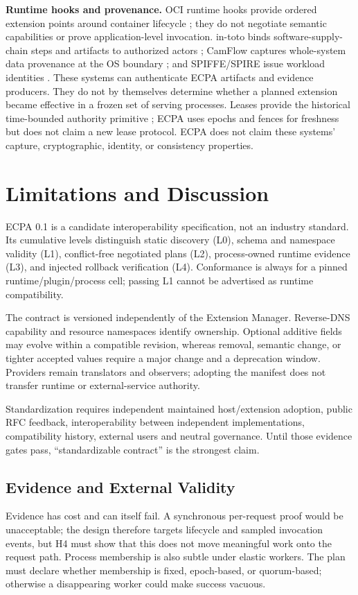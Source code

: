 \documentclass[letterpaper,twocolumn,10pt]{article}
\begin{document}
\textbf{Runtime hooks and provenance.}  OCI runtime hooks provide ordered
extension points around container lifecycle \cite{oci-runtime}; they do not
negotiate semantic capabilities or prove application-level invocation.
in-toto binds software-supply-chain steps and artifacts to authorized actors
\cite{in-toto}; CamFlow captures whole-system data provenance at the OS boundary
\cite{camflow}; and SPIFFE/SPIRE issue workload identities
\cite{spiffe,spire}.  These systems can authenticate ECPA artifacts and evidence
producers.  They do not by themselves determine whether a planned extension
became effective in a frozen set of serving processes.  Leases provide the
historical time-bounded authority primitive \cite{leases}; ECPA uses epochs and
fences for freshness but does not claim a new lease protocol.  ECPA does not
claim these systems' capture, cryptographic, identity, or consistency
properties.

\section{Limitations and Discussion}
ECPA 0.1 is a candidate interoperability specification, not an industry
standard.  Its cumulative levels distinguish static discovery (L0), schema and
namespace validity (L1), conflict-free negotiated plans (L2), process-owned
runtime evidence (L3), and injected rollback verification (L4).  Conformance
is always for a pinned runtime/plugin/process cell; passing L1 cannot be
advertised as runtime compatibility.

The contract is versioned independently of the Extension Manager.  Reverse-DNS
capability and resource namespaces identify ownership.  Optional additive
fields may evolve within a compatible revision, whereas removal, semantic
change, or tighter accepted values require a major change and a deprecation
window.  Providers remain translators and observers; adopting the manifest
does not transfer runtime or external-service authority.

Standardization requires independent maintained host/extension adoption,
public RFC feedback, interoperability between independent implementations,
compatibility history, external users and neutral governance.  Until those
evidence gates pass, ``standardizable contract'' is the strongest claim.

\subsection{Evidence and External Validity}
Evidence has cost and can itself fail.  A synchronous per-request proof would
be unacceptable; the design therefore targets lifecycle and sampled invocation
events, but H4 must show that this does not move meaningful work onto the
request path.  Process membership is also subtle under elastic workers.  The
plan must declare whether membership is fixed, epoch-based, or quorum-based;
otherwise a disappearing worker could make success vacuous.
\end{document}

